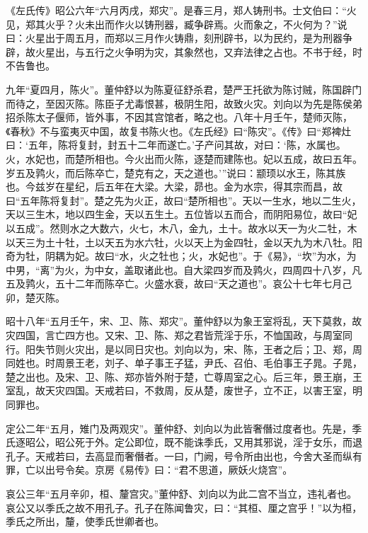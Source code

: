 \documentclass[12pt,UTF8]{ctexbook}
\begin{document}
《左氏传》昭公六年“六月丙戌，郑灾”。是春三月，郑人铸刑书。士文伯曰：“火见，郑其火乎？火未出而作火以铸刑器，臧争辟焉。火而象之，不火何为？”说曰：火星出于周五月，而郑以三月作火铸鼎，刻刑辟书，以为民约，是为刑器争辟，故火星出，与五行之火争明为灾，其象然也，又弃法律之占也。不书于经，时不告鲁也。



九年“夏四月，陈火”。董仲舒以为陈夏征舒杀君，楚严王托欲为陈讨贼，陈国辟门而待之，至因灭陈。陈臣子尤毒恨甚，极阴生阳，故致火灾。刘向以为先是陈侯弟招杀陈太子偃师，皆外事，不因其宫馆者，略之也。八年十月壬午，楚师灭陈，《春秋》不与蛮夷灭中国，故复书陈火也。《左氏经》曰“陈灾”。《传》曰“郑裨灶曰：‘五年，陈将复封，封五十二年而遂亡。’子产问其故，对曰：‘陈，水属也。火，水妃也，而楚所相也。今火出而火陈，逐楚而建陈也。妃以五成，故曰五年。岁五及鹑火，而后陈卒亡，楚克有之，天之道也。’”说曰：颛顼以水王，陈其族也。今兹岁在星纪，后五年在大梁。大梁，昴也。金为水宗，得其宗而昌，故曰“五年陈将复封”。楚之先为火正，故曰“楚所相也”。天以一生水，地以二生火，天以三生木，地以四生金，天以五生土。五位皆以五而合，而阴阳易位，故曰“妃以五成”。然则水之大数六，火七，木八，金九，土十。故水以天一为火二牡，木以天三为土十牡，土以天五为水六牡，火以天上为金四牡，金以天九为木八牡。阳奇为牡，阴耦为妃。故曰“水，火之牡也；火，水妃也”。于《易》，“坎”为水，为中男，“离”为火，为中女，盖取诸此也。自大梁四岁而及鹑火，四周四十八岁，凡五及鹑火，五十二年而陈卒亡。火盛水衰，故曰“天之道也”。哀公十七年七月己卯，楚灭陈。



昭十八年“五月壬午，宋、卫、陈、郑灾”。董仲舒以为象王室将乱，天下莫救，故灾四国，言亡四方也。又宋、卫、陈、郑之君皆荒淫于乐，不恤国政，与周室同行。阳失节则火灾出，是以同日灾也。刘向以为，宋、陈，王者之后；卫、郑，周同姓也。时周景王老，刘子、单子事王子猛，尹氏、召伯、毛伯事王子晁。子晁，楚之出也。及宋、卫、陈、郑亦皆外附于楚，亡尊周室之心。后三年，景王崩，王室乱，故天灾四国。天戒若曰，不救周，反从楚，废世子，立不正，以害王室，明同罪也。



定公二年“五月，雉门及两观灾”。董仲舒、刘向以为此皆奢僭过度者也。先是，季氏逐昭公，昭公死于外。定公即位，既不能诛季氏，又用其邪说，淫于女乐，而退孔子。天戒若曰，去高显而奢僭者。一曰，门阙，号令所由出也，今舍大圣而纵有罪，亡以出号令矣。京房《易传》曰：“君不思道，厥妖火烧宫”。



哀公三年“五月辛卯，桓、釐宫灾。”董仲舒、刘向以为此二宫不当立，违礼者也。哀公又以季氏之故不用孔子。孔子在陈闻鲁灾，曰：“其桓、厘之宫乎！”以为桓，季氏之所出，釐，使季氏世卿者也。
\end{document}
